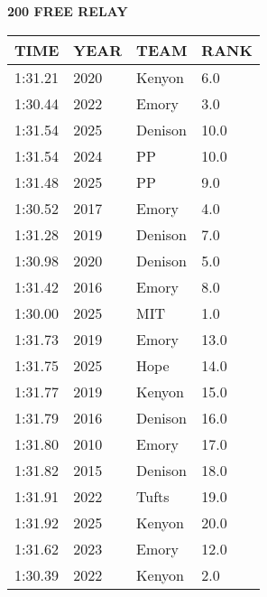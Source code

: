 \begin{table}[H]
\centering
\begin{minipage}[t]{0.6\textwidth}
\centering
\textbf{200 FREE RELAY}\\[0.1cm]
\begin{tabular}{@{}p{1.8cm}p{1.2cm}p{1.4cm}p{0.8cm}@{}}
\hline
    \textbf{TIME} & \textbf{YEAR} & \textbf{TEAM} & \textbf{RANK} \\
\hline
    1:31.21 & 2020 & Kenyon & 6.0 \\
    1:30.44 & 2022 & Emory & 3.0 \\
    1:31.54 & 2025 & Denison & 10.0 \\
    1:31.54 & 2024 & PP & 10.0 \\
    1:31.48 & 2025 & PP & 9.0 \\
    1:30.52 & 2017 & Emory & 4.0 \\
    1:31.28 & 2019 & Denison & 7.0 \\
    1:30.98 & 2020 & Denison & 5.0 \\
    1:31.42 & 2016 & Emory & 8.0 \\
    1:30.00 & 2025 & MIT & 1.0 \\
    1:31.73 & 2019 & Emory & 13.0 \\
    1:31.75 & 2025 & Hope & 14.0 \\
    1:31.77 & 2019 & Kenyon & 15.0 \\
    1:31.79 & 2016 & Denison & 16.0 \\
    1:31.80 & 2010 & Emory & 17.0 \\
    1:31.82 & 2015 & Denison & 18.0 \\
    1:31.91 & 2022 & Tufts & 19.0 \\
    1:31.92 & 2025 & Kenyon & 20.0 \\
    1:31.62 & 2023 & Emory & 12.0 \\
    1:30.39 & 2022 & Kenyon & 2.0 \\
\hline
\end{tabular}
\end{minipage}
\end{table}

